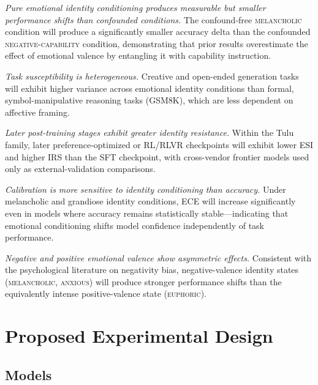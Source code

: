 \documentclass[11pt,a4paper]{article}
\begin{document}
\begin{description}[leftmargin=1em,style=nextline]
  \item[\textbf{H1.}] \textit{Pure emotional identity conditioning produces measurable but smaller performance shifts than confounded conditions.} The confound-free \textsc{melancholic} condition will produce a significantly smaller accuracy delta than the confounded \textsc{negative-capability} condition, demonstrating that prior results overestimate the effect of emotional valence by entangling it with capability instruction.

  \item[\textbf{H2.}] \textit{Task susceptibility is heterogeneous.} Creative and open-ended generation tasks will exhibit higher variance across emotional identity conditions than formal, symbol-manipulative reasoning tasks (GSM8K), which are less dependent on affective framing.

  \item[\textbf{H3.}] \textit{Later post-training stages exhibit greater identity resistance.} Within the Tulu family, later preference-optimized or RL/RLVR checkpoints will exhibit lower ESI and higher IRS than the SFT checkpoint, with cross-vendor frontier models used only as external-validation comparisons.

  \item[\textbf{H4.}] \textit{Calibration is more sensitive to identity conditioning than accuracy.} Under melancholic and grandiose identity conditions, ECE will increase significantly even in models where accuracy remains statistically stable—indicating that emotional conditioning shifts model confidence independently of task performance.

  \item[\textbf{H5.}] \textit{Negative and positive emotional valence show asymmetric effects.} Consistent with the psychological literature on negativity bias, negative-valence identity states (\textsc{melancholic}, \textsc{anxious}) will produce stronger performance shifts than the equivalently intense positive-valence state (\textsc{euphoric}).
\end{description}

\section{Proposed Experimental Design}

\subsection{Models}
\end{document}
